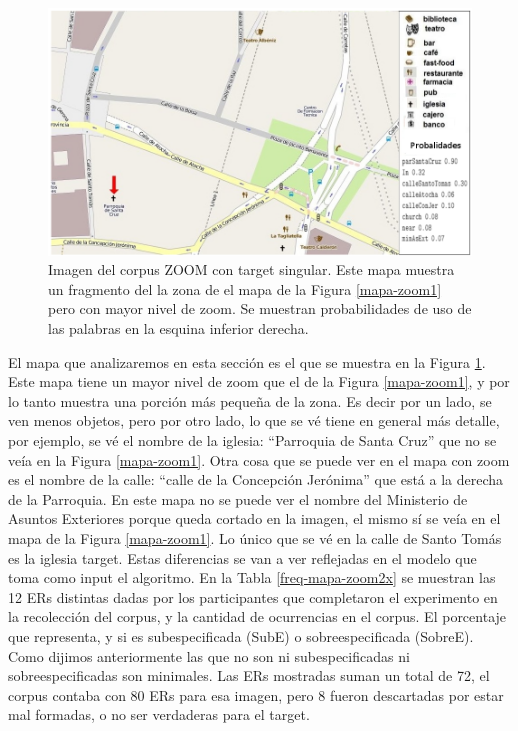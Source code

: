 \begin{figure}[H]
\centering
\includegraphics[width=\textwidth]{images/corpus/mapa16-prob.png}
\caption{Imagen del corpus ZOOM con target singular. Este mapa muestra un fragmento del la zona de el mapa de la Figura \ref{mapa-zoom1} pero con mayor nivel de zoom. Se muestran probabilidades de uso de las palabras en la esquina inferior derecha.}
\label{mapa-zoom2x}
\end{figure}
El mapa que analizaremos en esta secci\'on es el que se muestra en la Figura \ref{mapa-zoom2x}. Este mapa tiene un mayor nivel de zoom que el de la Figura \ref{mapa-zoom1}, y por lo tanto muestra una porci\'on m\'as peque\~na de la zona. Es decir por un lado, se ven menos objetos, pero por otro lado, lo que se v\'e tiene en general m\'as detalle, por ejemplo, se v\'e el nombre de la iglesia:
 ``Parroquia de Santa Cruz'' que no se ve\'ia en la Figura \ref{mapa-zoom1}. Otra cosa 
que se puede ver en el mapa con zoom es el nombre de la calle: ``calle de la Concepci\'on Jer\'onima'' que est\'a a la derecha de la Parroquia.
En este mapa no se puede ver el nombre del Ministerio de Asuntos Exteriores porque queda cortado en la imagen, el mismo s\'i se ve\'ia en el mapa de la Figura \ref{mapa-zoom1}. Lo \'unico que se v\'e en la calle de Santo Tom\'as es la iglesia target. Estas diferencias se van a ver reflejadas en el modelo que toma como input el algoritmo.
En la Tabla \ref{freq-mapa-zoom2x} se muestran las 12 ERs distintas dadas por los participantes que completaron el experimento en la recolecci\'on del corpus, y la cantidad de ocurrencias en el corpus. El porcentaje que representa, y si es subespecificada (SubE) o sobreespecificada (SobreE). Como dijimos anteriormente las que no son ni subespecificadas ni sobreespecificadas son minimales. Las ERs mostradas suman un total de 72, el corpus contaba con 80 ERs para esa imagen, pero 8 fueron descartadas por estar mal formadas, o no ser verdaderas para el target.
